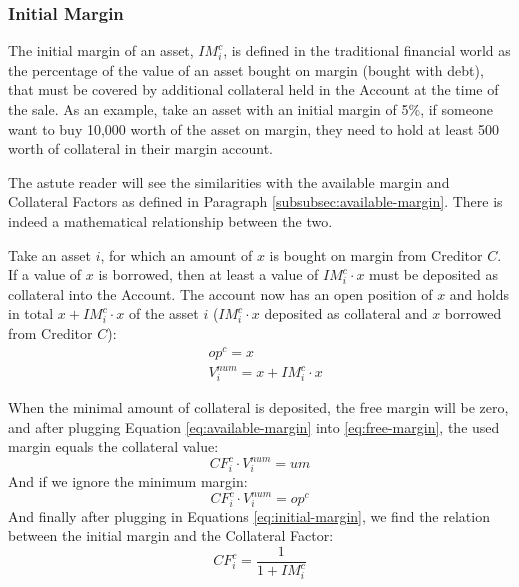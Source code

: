\documentclass[sigconf,nonacm]{acmart}
\begin{document}
\subsubsection{Initial Margin}
\label{subsubsec:initial-margin}
The initial margin of an asset, $IM_{i}^{c}$, is defined in the traditional financial world as the percentage of the value of an asset bought on margin (bought with debt),
that must be covered by additional collateral held in the Account at the time of the sale.
As an example, take an asset with an initial margin of 5\%, if someone want to buy 10,000 worth of the asset on margin, they need to hold at least 500 worth of collateral in their margin account.

The astute reader will see the similarities with the available margin and Collateral Factors as defined in Paragraph \ref{subsubsec:available-margin}.
There is indeed a mathematical relationship between the two.

Take an asset $i$, for which an amount of $x$ is bought on margin from Creditor $C$.
If a value of $x$ is borrowed, then at least a value of $IM_{i}^{c} \cdot x$ must be deposited as collateral into the Account.
The account now has an open position of $x$ and holds in total $x + IM_{i}^{c} \cdot x$ of the asset $i$ ($IM_{i}^{c} \cdot x$ deposited as collateral and $x$ borrowed from Creditor $C$):
\begin{equation}
    \label{eq:initial-margin}
    \begin{split}
        &op^c = x\\
        &V^{num}_i = x + IM_{i}^{c} \cdot x
    \end{split}
\end{equation}

When the minimal amount of collateral is deposited, the free margin will be zero, and after plugging Equation \ref{eq:available-margin} into \ref{eq:free-margin}, the used margin equals the collateral value:
\begin{equation}
    CF_{i}^{c} \cdot V^{num}_i = um
\end{equation}
And if we ignore the minimum margin:
\begin{equation}
    CF_{i}^{c} \cdot V^{num}_i = op^c
\end{equation}
And finally after plugging in Equations \ref{eq:initial-margin}, we find the relation between the initial margin and the Collateral Factor:
\begin{equation}
    CF_{i}^{c} = \frac{1}{1 + IM_{i}^{c}}
\end{equation}
\end{document}
